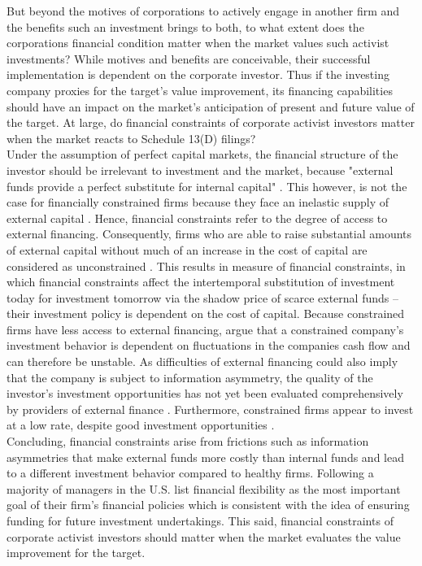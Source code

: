 \documentclass[12pt]{article}
\begin{document}
But beyond the motives of corporations to actively engage in another firm and the benefits such an investment brings to both, to what extent does the corporations financial condition matter when the market values such activist investments?  While motives and benefits are conceivable, their successful implementation is dependent on the corporate investor. 
Thus if the investing company proxies for the target's value improvement, its financing capabilities should have an impact on the market's anticipation of present and future value of the target. At large, do financial constraints of corporate activist investors matter when the market reacts to Schedule 13(D) filings?\\
Under the assumption of perfect capital markets, the financial structure of the investor should be irrelevant to investment and the market, because "external funds provide a perfect substitute for internal capital" \citep[p. 141]{Fazzari1988}. This however, is not the case for financially constrained firms because they face an inelastic supply of external capital \citep[p.1]{Farre-mensa2013}. Hence, financial constraints refer to the degree of access to external financing. Consequently, firms who are able to raise substantial amounts of external capital without much of an increase in the cost of capital are considered as unconstrained \citep[p.1]{Farre-mensa2013}. This results in \citet[p.531]{Whited2006} measure of financial constraints, in which financial constraints affect the intertemporal substitution of investment today for investment tomorrow via the shadow price of scarce external funds -- their investment policy is dependent on the cost of capital. Because constrained firms have less access to external financing, \citet[p. 142]{Fazzari1988} argue that a constrained company's investment behavior is dependent on fluctuations in the companies cash flow and can therefore be unstable. As difficulties of external financing could also imply that the company is subject to information asymmetry, the quality of the investor's investment opportunities has not yet been evaluated comprehensively by providers of external finance \citep[p.142]{Fazzari1988}. Furthermore, constrained firms appear to invest at a low rate, despite good investment opportunities \citep[p.533]{Whited2006}.\\
Concluding, financial constraints arise from frictions such as information asymmetries that make external funds more costly than internal funds and lead to a different investment behavior compared to healthy firms. 
Following \citet[p.691]{Almeida2011} a majority of managers in the U.S. list financial flexibility as the most important goal of their firm's financial policies which is consistent with the idea of ensuring funding for future investment undertakings. This said, financial constraints of corporate activist investors should matter when the market evaluates the value improvement for the target.
\end{document}
